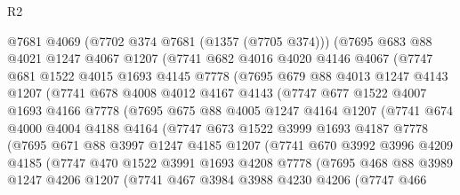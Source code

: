 \begin{lexlean}{R2}
\begin{coremodule}
      @7681
      @4069
      (@7702 @374 @7681 (@1357 (@7705 @374)))
      (@7695
        @683
        @88
        @4021
        @1247
        @4067
        @1207
        (@7741
          @682
          @4016
          @4020
          @4146
          @4067
          (@7747
            @681
            @1522
            @4015
            @1693
            @4145
            @7778
            (@7695
              @679
              @88
              @4013
              @1247
              @4143
              @1207
              (@7741
                @678
                @4008
                @4012
                @4167
                @4143
                (@7747
                  @677
                  @1522
                  @4007
                  @1693
                  @4166
                  @7778
                  (@7695
                    @675
                    @88
                    @4005
                    @1247
                    @4164
                    @1207
                    (@7741
                      @674
                      @4000
                      @4004
                      @4188
                      @4164
                      (@7747
                        @673
                        @1522
                        @3999
                        @1693
                        @4187
                        @7778
                        (@7695
                          @671
                          @88
                          @3997
                          @1247
                          @4185
                          @1207
                          (@7741
                            @670
                            @3992
                            @3996
                            @4209
                            @4185
                            (@7747
                              @470
                              @1522
                              @3991
                              @1693
                              @4208
                              @7778
                              (@7695
                                @468
                                @88
                                @3989
                                @1247
                                @4206
                                @1207
                                (@7741
                                  @467
                                  @3984
                                  @3988
                                  @4230
                                  @4206
                                  (@7747
                                    @466

\end{coremodule}
\end{lexlean}
